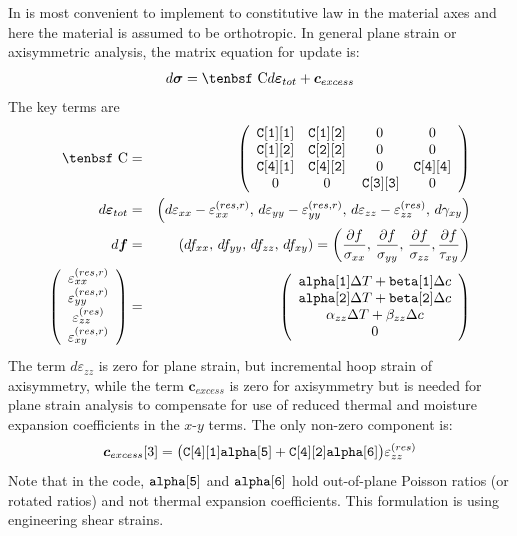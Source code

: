 \documentclass[11pt]{book}
\renewcommand{\vec}[1]{\boldsymbol{#1}}
\def\a#1{\alpha_{#1}}
\def\b#1{\beta_{#1}}
\def\C{\hbox{\tenbsf C}}
\def\cex{\vec{c}_{excess}}
\def\code#1{{\small\tt #1}}
\def\deff{d \vec{\varepsilon}_{tot}}
\def\df{d \vec{f}}
\def\dsig{d \vec{\sigma}}
\def\DT{\Delta T}
\def\e#1{\varepsilon_{#1}}
\def\er#1{\varepsilon_{#1}^{(res)}}
\def\err#1{\varepsilon_{#1}^{(res,r)}}
\def\g#1{\gamma_{#1}}
\begin{document}
In is most convenient to implement to constitutive law in the material axes and here the material is assumed to be orthotropic.
In general plane strain or axisymmetric analysis, the matrix equation for update is:
\begin{equation}
    \dsig = \C \deff +\cex
\end{equation}
The key terms are
\begin{eqnarray}
      \C & = & \left(\begin{array}{cccc} \code{C[1][1]}  & \code{C[1][2]}  & 0  & 0   \\
                    \code{C[1][2]}  & \code{C[2][2]}  & 0  & 0 \\
                            \code{C[4][1]}  & \code{C[4][2]}  & 0  & \code{C[4][4]}  \\
                 0  & 0  & \thinspace\code{C[3][3]}  & 0 \end{array}\right)  \\
      \deff & = & \left(d\e{xx} - \err{xx}, \thinspace d\e{yy} - \err{yy}, \thinspace d\e{zz} -  \er{zz}, 
              \thinspace d\g{xy}\right) \\
      \df & = & (df_{xx}, \thinspace df_{yy}, \thinspace df_{zz}, \thinspace df_{xy})
                  = \left({\partial f\over \sigma_{xx}}, \thinspace {\partial f\over \sigma_{yy}}, \thinspace {\partial f\over \sigma_{zz}},
                                {\partial f\over \tau_{xy}}\right)  \\
\left(\begin{array}{c} \err{xx} \\ \err{yy} \\ \er{zz} \\ \err{xy} \end{array}\right)
       & = &  \left(\begin{array}{c}
	\code{alpha[1]}\DT + \code{beta[1]}\Delta c \\
	\code{alpha[2]}\DT + \code{beta[2]}\Delta c \\
	\a{zz}\DT + \b{zz}\Delta c \\
	0  \end{array}\right) 
 \end{eqnarray}
The term $d\e{zz}$ is zero for plane strain, but incremental hoop strain of axisymmetry, while the term $\cex$ is zero for axisymmetry but is needed for plane strain analysis to compensate for use of reduced thermal and moisture expansion coefficients in the $x$-$y$ terms. The only non-zero component is:
\begin{equation}
      \cex[3] = \bigl(\code{C[4][1]}\code{alpha[5]}
              + \code{C[4][2]}\code{alpha[6]}\bigr)\er{zz} 
\end{equation}
Note that in the code, $\code{alpha[5]}$ and $\code{alpha[6]}$ hold out-of-plane Poisson ratios (or rotated ratios) and not thermal expansion coefficients.
This formulation is using engineering shear strains. 
 
\end{document}
